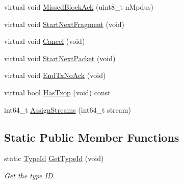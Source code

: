 \begin{DoxyCompactItemize}
\item 
virtual void \hyperlink{classns3_1_1DcaTxop_ad04891e7b45d073a36d937468a51334f}{Missed\+Block\+Ack} (uint8\+\_\+t n\+Mpdus)
\item 
virtual void \hyperlink{classns3_1_1DcaTxop_a2055d310a17ffe4be6b2d2ec91587429}{Start\+Next\+Fragment} (void)
\item 
virtual void \hyperlink{classns3_1_1DcaTxop_ab5eaa255beb4799be8ab2e1e8b585c9c}{Cancel} (void)
\item 
virtual void \hyperlink{classns3_1_1DcaTxop_ab97797d4b9869abb9a0bfcb4c90b4f71}{Start\+Next\+Packet} (void)
\item 
virtual void \hyperlink{classns3_1_1DcaTxop_a49f0531900461b87bd1065780ae4caae}{End\+Tx\+No\+Ack} (void)
\item 
virtual bool \hyperlink{classns3_1_1DcaTxop_a90d763c1c16a5223d5cab486e6f1654e}{Has\+Txop} (void) const 
\item 
int64\+\_\+t \hyperlink{classns3_1_1DcaTxop_a2a883932e6a255a5478c9594974dcdaa}{Assign\+Streams} (int64\+\_\+t stream)
\end{DoxyCompactItemize}
\subsection*{Static Public Member Functions}
\begin{DoxyCompactItemize}
\item 
static \hyperlink{classns3_1_1TypeId}{Type\+Id} \hyperlink{classns3_1_1DcaTxop_ae830b7744456e7e1aa6e4bbf49042226}{Get\+Type\+Id} (void)
\begin{DoxyCompactList}\small\item\em Get the type ID. \end{DoxyCompactList}\end{DoxyCompactItemize}
